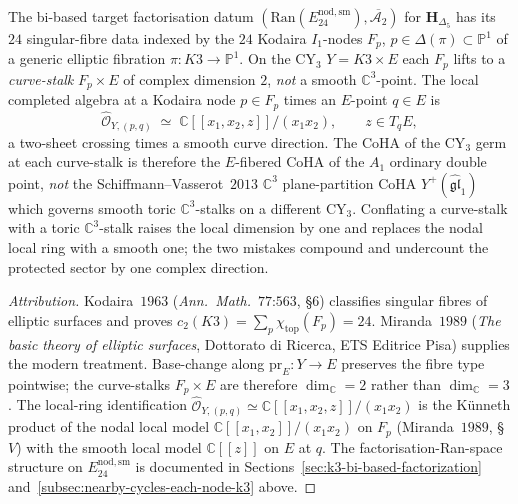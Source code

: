 \begin{theorem}
\label{thm:k3-chiral-bialgebra-24-curve-stalks}
The bi-based target factorisation datum
$(\mathrm{Ran}(E^{\mathrm{nod, sm}}_{24}), \overline{\mathcal{A}_2})$
for $\mathbf{H}_{\Delta_5}$ has its $24$ singular-fibre data indexed by
the $24$ Kodaira $I_1$-nodes $F_p$, $p \in \Delta(\pi) \subset
\mathbb{P}^1$ of a generic elliptic fibration
$\pi \colon K3 \to \mathbb{P}^1$.  On the CY$_3$ $Y = K3 \times E$ each
$F_p$ lifts to a \emph{curve-stalk} $F_p \times E$ of complex dimension
$2$, \emph{not} a smooth $\mathbb{C}^3$-point.  The local completed
algebra at a Kodaira node $p \in F_p$ times an $E$-point $q \in E$ is
\[
 \widehat{\mathcal{O}}_{Y, (p, q)} \;\simeq\; \mathbb{C}[[x_1, x_2, z]]/(x_1 x_2), \qquad z \in T_q E,
\]
a two-sheet crossing times a smooth curve direction. The CoHA of the CY$_3$ germ at each curve-stalk is therefore the $E$-fibered CoHA of the $A_1$ ordinary double point, \emph{not} the Schiffmann--Vasserot~$2013$ $\mathbb{C}^3$ plane-partition CoHA $Y^+(\widehat{\mathfrak{gl}}_1)$ which governs smooth toric $\mathbb{C}^3$-stalks on a different CY$_3$. Conflating a curve-stalk with a toric $\mathbb{C}^3$-stalk raises the local dimension by one and replaces the nodal local ring with a smooth one; the two mistakes compound and undercount the protected sector by one complex direction.
\end{theorem}

\begin{proof}[Attribution]
Kodaira~$1963$ (\emph{Ann.\ Math.}~$77$:$563$, \S$6$) classifies singular fibres of elliptic surfaces and proves $c_2(K3) = \sum_p \chi_{\mathrm{top}}(F_p) = 24$. Miranda~$1989$ (\emph{The basic theory of elliptic surfaces}, Dottorato di Ricerca, ETS Editrice Pisa) supplies the modern treatment. Base-change along $\mathrm{pr}_E \colon Y \to E$ preserves the fibre type pointwise; the curve-stalks $F_p \times E$ are therefore $\dim_{\mathbb{C}} = 2$ rather than $\dim_{\mathbb{C}} = 3$. The local-ring identification $\widehat{\mathcal{O}}_{Y, (p, q)} \simeq \mathbb{C}[[x_1, x_2, z]]/(x_1 x_2)$ is the K\"unneth product of the nodal local model $\mathbb{C}[[x_1, x_2]]/(x_1 x_2)$ on $F_p$ (Miranda~$1989$, \S$V$) with the smooth local model $\mathbb{C}[[z]]$ on $E$ at $q$. The factorisation-Ran-space structure on $E^{\mathrm{nod, sm}}_{24}$ is documented in Sections~\ref{sec:k3-bi-based-factorization} and~\ref{subsec:nearby-cycles-each-node-k3} above.
\end{proof}

